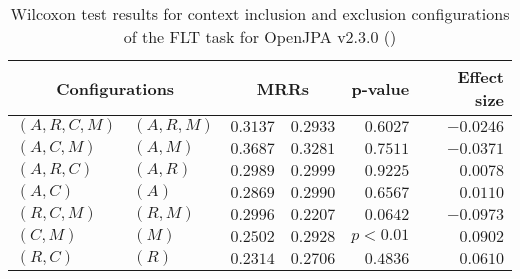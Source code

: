 
\begin{table}
\begin{spacing}{1.2}
\centering
\caption{Wilcoxon test results for context inclusion and exclusion configurations of the FLT task for OpenJPA v2.3.0 (\ctwo)}
\label{table:versus-wilcox-openjpa-flt-context}
\begin{tabular}{ll|rr|rr}
\toprule
      \multicolumn{2}{c|}{Configurations} &                \multicolumn{2}{c|}{MRRs} &             p-value & Effect size \\
\midrule
 $(A,R,C,M)$ &  $(A,R,M)$ &  $\bm{0.3137}$ &       $0.2933$ & $0.6027$ &   $-0.0246$ \\
   $(A,C,M)$ &    $(A,M)$ &  $\bm{0.3687}$ &       $0.3281$ & $0.7511$ &   $-0.0371$ \\
   $(A,R,C)$ &    $(A,R)$ &       $0.2989$ &  $\bm{0.2999}$ & $0.9225$ &    $0.0078$ \\
     $(A,C)$ &      $(A)$ &       $0.2869$ &  $\bm{0.2990}$ & $0.6567$ &    $0.0110$ \\
   $(R,C,M)$ &    $(R,M)$ &  $\bm{0.2996}$ &       $0.2207$ & $0.0642$ &   $-0.0973$ \\
     $(C,M)$ &      $(M)$ &       $0.2502$ &  $\bm{0.2928}$ & $p<0.01$ &    $0.0902$ \\
     $(R,C)$ &      $(R)$ &       $0.2314$ &  $\bm{0.2706}$ & $0.4836$ &    $0.0610$ \\
\bottomrule
\end{tabular}

\end{spacing}
\end{table}

